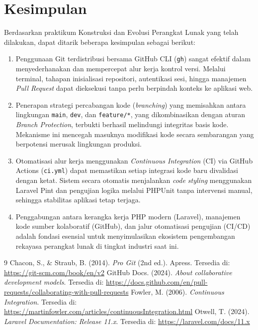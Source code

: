 \chapter{Kesimpulan}
Berdasarkan praktikum Konstruksi dan Evolusi Perangkat Lunak yang telah dilakukan, dapat ditarik beberapa kesimpulan sebagai berikut:
\begin{enumerate}
    \item Penggunaan Git terdistribusi bersama GitHub CLI (\texttt{gh}) sangat efektif dalam menyederhanakan dan mempercepat alur kerja kontrol versi. Melalui terminal, tahapan inisialisasi repositori, autentikasi sesi, hingga manajemen \textit{Pull Request} dapat dieksekusi tanpa perlu berpindah konteks ke aplikasi web.
    \item Penerapan strategi percabangan kode (\textit{branching}) yang memisahkan antara lingkungan \texttt{main}, \texttt{dev}, dan \texttt{feature/*}, yang dikombinasikan dengan aturan \textit{Branch Protection}, terbukti berhasil melindungi integritas basis kode. Mekanisme ini mencegah masuknya modifikasi kode secara sembarangan yang berpotensi merusak lingkungan produksi.
    \item Otomatisasi alur kerja menggunakan \textit{Continuous Integration} (CI) via GitHub Actions (\texttt{ci.yml}) dapat memastikan setiap integrasi kode baru divalidasi dengan ketat. Sistem secara otomatis menjalankan \textit{code styling} menggunakan Laravel Pint dan pengujian logika melalui PHPUnit tanpa intervensi manual, sehingga stabilitas aplikasi tetap terjaga.
    \item Penggabungan antara kerangka kerja PHP modern (Laravel), manajemen kode sumber kolaboratif (GitHub), dan jalur otomatisasi pengujian (CI/CD) adalah fondasi esensial untuk menyimulasikan ekosistem pengembangan rekayasa perangkat lunak di tingkat industri saat ini.
\end{enumerate}
\renewcommand{\bibname}{Daftar Pustaka}
\begin{thebibliography}{9}
Chacon, S., \& Straub, B. (2014). \textit{Pro Git} (2nd ed.). Apress. Tersedia di: \url{https://git-scm.com/book/en/v2}
GitHub Docs. (2024). \textit{About collaborative development models}. Tersedia di: \url{https://docs.github.com/en/pull-requests/collaborating-with-pull-requests}
Fowler, M. (2006). \textit{Continuous Integration}. Tersedia di: \url{https://martinfowler.com/articles/continuousIntegration.html}
Otwell, T. (2024). \textit{Laravel Documentation: Release 11.x}. Tersedia di: \url{https://laravel.com/docs/11.x}
\end{thebibliography}